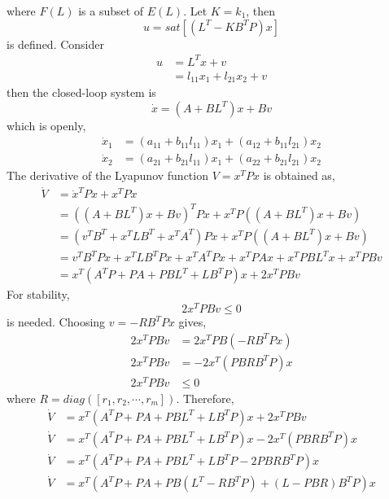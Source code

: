 where $F(L)$ is a subset of $E(L)$.
Let $K=k_1$, then 
\begin{equation}
    u=sat[(L^T-KB^TP)x]
\end{equation}
is defined. Consider 
\begin{equation}
\begin{split}
    u&=L^Tx+v\\
    &=l_{11}x_1+l_{21}x_2+v
\end{split}
\end{equation}
then the closed-loop system is 
\begin{equation}
    \dot{x}=(A+BL^T)x+Bv
\end{equation}
which is openly,
\begin{equation}
    \begin{split}
        \dot{x}_1&=(a_{11} + b_{11}l_{11})x_1+(a_{12} + b_{11}l_{21})x_2\\
        \dot{x}_2&=(a_{21} + b_{21}l_{11})x_1+(a_{22} + b_{21}l_{21})x_2
    \end{split}
\end{equation}
The derivative of the Lyapunov function $V=x^TPx$ is obtained as,
\begin{equation}
\begin{split}
    \dot{V}&=\dot{x}^TPx+x^TP\dot{x}\\
    &=((A+BL^T)x+Bv)^TPx+x^TP((A+BL^T)x+Bv)\\
    &=(v^TB^T+x^TLB^T+x^TA^T)Px+x^TP((A+BL^T)x+Bv)\\
    &=v^TB^TPx+x^TLB^TPx+x^TA^TPx+x^TPAx+x^TPBL^Tx+x^TPBv\\
    &=x^T(A^TP+PA+PBL^T+LB^TP)x+2x^TPBv
\end{split}
\end{equation}
For stability,
\begin{equation}
    2x^TPBv\leq 0
\end{equation}
is needed. Choosing $v=-RB^TPx$ gives,
\begin{equation}
    \begin{split}
        2x^TPBv&=2x^TPB(-RB^TPx)\\
        2x^TPBv&=-2x^T(PBRB^TP)x\\
        2x^TPBv&\leq 0
    \end{split}
\end{equation}
where $R=diag([r_1,r_2,\cdots,r_m])$. Therefore,
\begin{equation}
    \begin{split}
        \dot{V}&=x^T(A^TP+PA+PBL^T+LB^TP)x+2x^TPBv\\
        \dot{V}&=x^T(A^TP+PA+PBL^T+LB^TP)x-2x^T(PBRB^TP)x\\
        \dot{V}&=x^T(A^TP+PA+PBL^T+LB^TP-2PBRB^TP)x\\
        \dot{V}&=x^T(A^TP+PA+PB(L^T-RB^TP)+(L-PBR)B^TP)x
    \end{split}
\end{equation}
